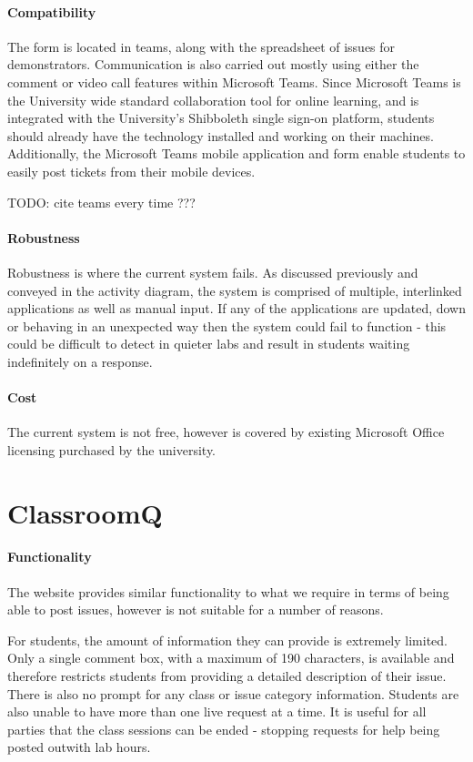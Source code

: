 \paragraph{Compatibility}  
The form is located in teams, along with the spreadsheet of issues for demonstrators. Communication is also carried out mostly using either the comment or video call features within Microsoft Teams. Since Microsoft Teams is the University wide standard collaboration tool for online learning, and is integrated with the University's Shibboleth \cite{shibboleth} single sign-on platform, students should already have the technology installed and working on their machines. Additionally, the Microsoft Teams mobile application and form enable students to easily post tickets from their mobile devices.

TODO: cite teams every time ???

\paragraph{Robustness}
Robustness is where the current system fails. As discussed previously and conveyed in the activity diagram, the system is comprised of multiple, interlinked applications as well as manual input. If any of the applications are updated, down or behaving in an unexpected way then the system could fail to function - this could be difficult to detect in quieter labs and result in students waiting indefinitely on a response.


\paragraph{Cost}  
The current system is not free, however is covered by existing Microsoft Office licensing purchased by the university.  

\newpage
\section{ClassroomQ}

\paragraph{Functionality}
The website provides similar functionality to what we require in terms of being able to post issues, however is not suitable for a number of reasons.

For students, the amount of information they can provide is extremely limited. Only a single comment box, with a maximum of 190 characters, is available and therefore restricts students from providing a detailed description of their issue. There is also no prompt for any class or issue category information. Students are also unable to have more than one live request at a time. It is useful for all parties that the class sessions can be ended - stopping requests for help being posted outwith lab hours.

